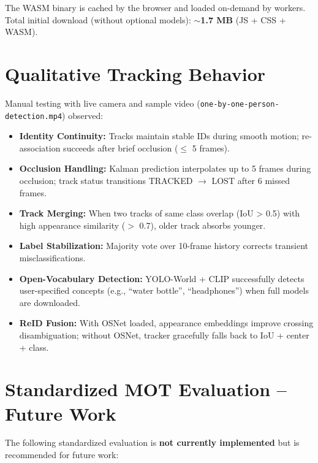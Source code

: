\vspace{0.3cm}

\noindent The WASM binary is cached by the browser and loaded on-demand by workers. Total initial download (without optional models): \textbf{$\sim$1.7 MB} (JS + CSS + WASM).

\section{Qualitative Tracking Behavior}
\label{sec:qualitative}

Manual testing with live camera and sample video (\texttt{one-by-one-person-detection.mp4}) observed:

\begin{itemize}
    \item \textbf{Identity Continuity:} Tracks maintain stable IDs during smooth motion; re-association succeeds after brief occlusion ($\le$ 5 frames).
    \item \textbf{Occlusion Handling:} Kalman prediction interpolates up to 5 frames during occlusion; track status transitions TRACKED $\to$ LOST after 6 missed frames.
    \item \textbf{Track Merging:} When two tracks of same class overlap (IoU > 0.5) with high appearance similarity ($>$ 0.7), older track absorbs younger.
    \item \textbf{Label Stabilization:} Majority vote over 10-frame history corrects transient misclassifications.
    \item \textbf{Open-Vocabulary Detection:} YOLO-World + CLIP successfully detects user-specified concepts (e.g., ``water bottle'', ``headphones'') when full models are downloaded.
    \item \textbf{ReID Fusion:} With OSNet loaded, appearance embeddings improve crossing disambiguation; without OSNet, tracker gracefully falls back to IoU + center + class.
\end{itemize}

\section{Standardized MOT Evaluation -- Future Work}
\label{sec:future-eval}

The following standardized evaluation is \textbf{not currently implemented} but is recommended for future work:

